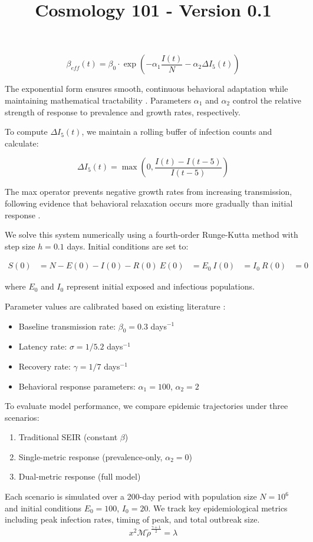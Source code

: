 \documentclass{article}\usepackage{graphicx} \usepackage{amsmath} \usepackage{colortbl}\title{Cosmology 101 - Version 0.1}
\begin{document}
\begin{equation}
\beta_{eff}(t) = \beta_0 \cdot \exp\left(-\alpha_1\frac{I(t)}{N} - \alpha_2\Delta I_5(t)\right)
\end{equation}

The exponential form ensures smooth, continuous behavioral adaptation while maintaining mathematical tractability \cite{wang2015coupled}. Parameters $\alpha_1$ and $\alpha_2$ control the relative strength of response to prevalence and growth rates, respectively.

To compute $\Delta I_5(t)$, we maintain a rolling buffer of infection counts and calculate:

\begin{equation}
\Delta I_5(t) = \max\left(0, \frac{I(t) - I(t-5)}{I(t-5)}\right)
\end{equation}

The max operator prevents negative growth rates from increasing transmission, following evidence that behavioral relaxation occurs more gradually than initial response \cite{funk2009spread}.

We solve this system numerically using a fourth-order Runge-Kutta method with step size $h=0.1$ days. Initial conditions are set to:

\begin{equation}
\begin{aligned}
S(0) &= N - E(0) - I(0) - R(0) \
E(0) &= E_0 \
I(0) &= I_0 \
R(0) &= 0
\end{aligned}
\end{equation}

where $E_0$ and $I_0$ represent initial exposed and infectious populations.

Parameter values are calibrated based on existing literature \cite{anderson1992infectious}:
\begin{itemize}
 \item Baseline transmission rate: $\beta_0 = 0.3$ days$^{-1}$
 \item Latency rate: $\sigma = 1/5.2$ days$^{-1}$
 \item Recovery rate: $\gamma = 1/7$ days$^{-1}$
 \item Behavioral response parameters: $\alpha_1 = 100$, $\alpha_2 = 2$
\end{itemize}

To evaluate model performance, we compare epidemic trajectories under three scenarios:
\begin{enumerate}
 \item Traditional SEIR (constant $\beta$)
 \item Single-metric response (prevalence-only, $\alpha_2 = 0$)
 \item Dual-metric response (full model)
\end{enumerate}

Each scenario is simulated over a 200-day period with population size $N = 10^6$ and initial conditions $E_0 = 100$, $I_0 = 20$. We track key epidemiological metrics including peak infection rates, timing of peak, and total outbreak size. \begin{equation}x^2 \mathcal{M} \tilde{\rho }^{\frac{\gamma +1}{2}}=\lambda \label{Mi ecuacion 8} \end{equation}
\end{document}
